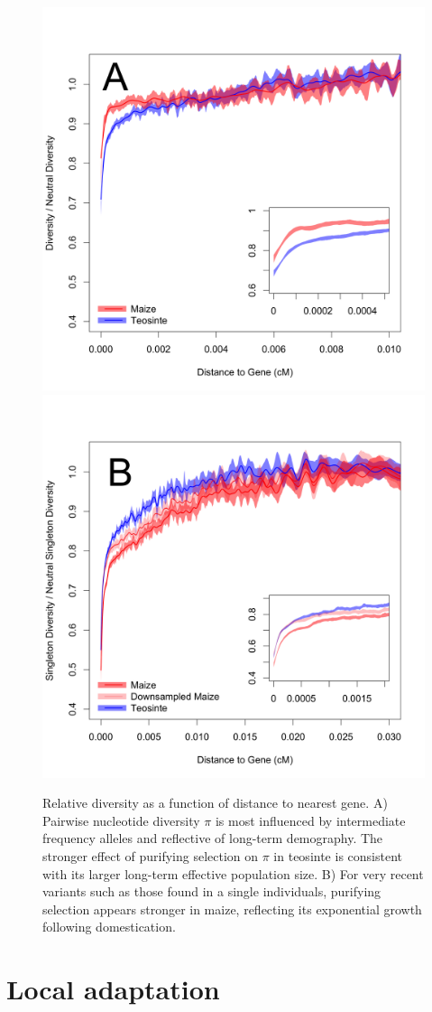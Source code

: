 \documentclass[11pt,letterpaper]{article}
\begin{document}
\begin{figure}[h]
\centering
\includegraphics[width=.45\textwidth]{figs/distanceToGene_WithSignificance_Folded2_manuscript.png} \includegraphics[width=.45\textwidth]{figs/distanceToGene_WithSignificance_Singletons_Downsampled_threeLines_manuscript.png}
\caption{Relative diversity as a function of distance to nearest gene. 
A) Pairwise nucleotide diversity $\pi$ is most influenced by intermediate frequency alleles and reflective of long-term demography. 
The stronger effect of purifying selection on $\pi$  in teosinte is consistent with its larger long-term effective population size. 
B) For very recent variants such as those found in a single individuals, purifying selection appears stronger in maize, reflecting its exponential growth following domestication. \label{fig:purify}}
\end{figure}



\section*{Local adaptation} %
\end{document}
